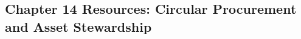 \begin{refsection}
\chapter{Chapter 14 Resources: Circular Procurement and Asset Stewardship}
\label{chap:comp-ch14}



\printbibliography[heading=subbibliography,title={Chapter 14 References}]
\end{refsection}
